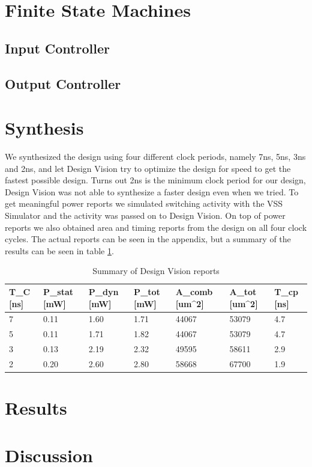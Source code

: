 \documentclass[11pt,a4paper]{article}
\begin{document}
\section{Finite State Machines}
\subsection{Input Controller}

\subsection{Output Controller}


\FloatBarrier
\section{Synthesis}
We synthesized the design using four different clock periods, namely 7ns, 5ns, 3ns and 2ns, and let Design Vision try to optimize the design for speed to get the fastest possible design. Turns out 2ns is the minimum clock period for our design, Design Vision was not able to synthesize a faster design even when we tried. To get meaningful power reports we simulated switching activity with the VSS Simulator and the activity was passed on to Design Vision. On top of power reports we also obtained area and timing reports from the design on all four clock cycles. The actual reports can be seen in the appendix, but a summary of the results can be seen in table \ref{tab:synth}.

\begin{table}[h]
	\caption{Summary of Design Vision reports}
	\begin{center}
		\begin{tabular}{|l|l|l|l|l|l|l|} \hline
			\textbf{T}_{C} [ns]	& \textbf{P}_{stat}	[mW] & \textbf{P}_{dyn} [mW]	& \textbf{P}_{tot} [mW] & \textbf{A}_{comb} [um^2]& \textbf{A}_{tot} [um^2] & \textbf{T}_{cp} [ns] \\ \hline
			7 & 0.11 & 1.60 & 1.71 & 44067 & 53079 & 4.7 \\ \hline
			5 & 0.11 & 1.71 & 1.82 & 44067 & 53079 & 4.7 \\ \hline
			3 & 0.13 & 2.19 & 2.32 & 49595 & 58611 & 2.9 \\ \hline
			2 & 0.20 & 2.60 & 2.80 & 58668 & 67700 & 1.9 \\ \hline
			
		\end{tabular}
	\end{center}
	\label{tab:synth}
\end{table}

\FloatBarrier
\section{Results}

\section{Discussion}
\end{document}

